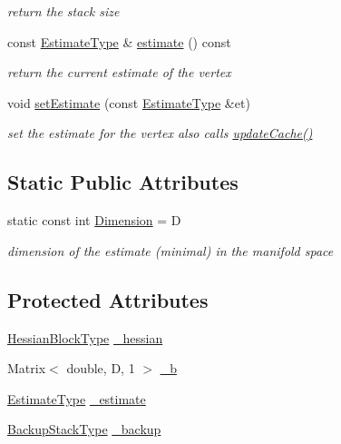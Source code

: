 \begin{DoxyCompactItemize}
\begin{DoxyCompactList}\small\item\em return the stack size \end{DoxyCompactList}\item 
const \hyperlink{classg2o_1_1BaseVertex_aaffb179a0d591da4769ec7c3fc7f7daa}{Estimate\+Type} \& \hyperlink{classg2o_1_1BaseVertex_abb9caa0d2d00af70e95963a11ee9660a}{estimate} () const 
\begin{DoxyCompactList}\small\item\em return the current estimate of the vertex \end{DoxyCompactList}\item 
void \hyperlink{classg2o_1_1BaseVertex_acb6e8e8f39caa04f62dd93a3dd400e06}{set\+Estimate} (const \hyperlink{classg2o_1_1BaseVertex_aaffb179a0d591da4769ec7c3fc7f7daa}{Estimate\+Type} \&et)
\begin{DoxyCompactList}\small\item\em set the estimate for the vertex also calls \hyperlink{classg2o_1_1OptimizableGraph_1_1Vertex_ab5972c8ba6834c4dcb8a2319e9bf3070}{update\+Cache()} \end{DoxyCompactList}\end{DoxyCompactItemize}
\subsection*{Static Public Attributes}
\begin{DoxyCompactItemize}
\item 
static const int \hyperlink{classg2o_1_1BaseVertex_a9a831bfdf84cfe625d8f942bc4f1c2d1}{Dimension} = D
\begin{DoxyCompactList}\small\item\em dimension of the estimate (minimal) in the manifold space \end{DoxyCompactList}\end{DoxyCompactItemize}
\subsection*{Protected Attributes}
\begin{DoxyCompactItemize}
\item 
\hyperlink{classg2o_1_1BaseVertex_a887928bc60710e0ec9acb269ee7411db}{Hessian\+Block\+Type} \hyperlink{classg2o_1_1BaseVertex_afaf73b0e874db76655d90bdb2f156c00}{\+\_\+hessian}
\item 
Matrix$<$ double, D, 1 $>$ \hyperlink{classg2o_1_1BaseVertex_a70c672f2997275927efa49c1f5b18ac3}{\+\_\+b}
\item 
\hyperlink{classg2o_1_1BaseVertex_aaffb179a0d591da4769ec7c3fc7f7daa}{Estimate\+Type} \hyperlink{classg2o_1_1BaseVertex_ab188c92c3e906c6e06507ae624c0e7ac}{\+\_\+estimate}
\item 
\hyperlink{classg2o_1_1BaseVertex_ae6632291d46b458196bdb021a6c8cba1}{Backup\+Stack\+Type} \hyperlink{classg2o_1_1BaseVertex_a936082916993857a77c8318bc3e59d23}{\+\_\+backup}
\end{DoxyCompactItemize}
